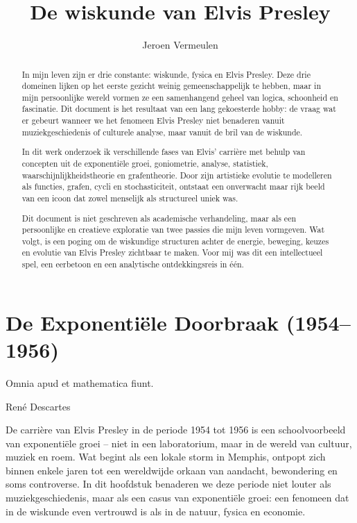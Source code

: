 \documentclass{book}
\begin{document}
	\title{De wiskunde van Elvis Presley}
	\author{Jeroen Vermeulen}
	\maketitle
	
	
	\begin{abstract}
		In mijn leven zijn er drie constante: wiskunde, fysica en Elvis Presley. 
		Deze drie domeinen lijken op het eerste gezicht weinig gemeenschappelijk te hebben, maar in mijn 
		persoonlijke wereld vormen ze een samenhangend geheel van logica, schoonheid en fascinatie. Dit 
		document is het resultaat van een lang gekoesterde hobby: de vraag wat er gebeurt wanneer we het 
		fenomeen Elvis Presley niet benaderen vanuit muziekgeschiedenis of culturele analyse, maar vanuit 
		de bril van de wiskunde.
		
		In dit werk onderzoek ik verschillende fases van Elvis' carri\`ere met behulp van concepten uit de 
		exponenti\"ele groei, goniometrie, analyse, statistiek, waarschijnlijkheidstheorie en grafentheorie. 
		Door zijn artistieke evolutie te modelleren als functies, grafen, cycli en stochasticiteit, ontstaat 
		een onverwacht maar rijk beeld van een icoon dat zowel menselijk als structureel uniek was.
		
		Dit document is niet geschreven als academische verhandeling, maar als een persoonlijke en creatieve 
		exploratie van twee passies die mijn leven vormgeven. Wat volgt, is een poging om de wiskundige 
		structuren achter de energie, beweging, keuzes en evolutie van Elvis Presley zichtbaar te maken. 
		Voor mij was dit een intellectueel spel, een eerbetoon en een analytische ontdekkingsreis in één.
	\end{abstract}
	
	
	\chapter{De Exponenti\"ele Doorbraak (1954--1956)}
	\label{chap:exponentieel}
	
	\epigraph{Omnia apud et mathematica fiunt.}{Ren\'e Descartes}
	
	De carri\`ere van Elvis Presley in de periode 1954 tot 1956 is een schoolvoorbeeld van
	exponenti\"ele groei -- niet in een laboratorium, maar in de wereld van cultuur, muziek en roem.
	Wat begint als een lokale storm in Memphis, ontpopt zich binnen enkele jaren tot een wereldwijde
	orkaan van aandacht, bewondering en soms controverse. In dit hoofdstuk benaderen we deze periode
	niet louter als muziekgeschiedenis, maar als een casus van exponenti\"ele groei: een fenomeen dat
	in de wiskunde even vertrouwd is als in de natuur, fysica en economie.
	
\end{document}
